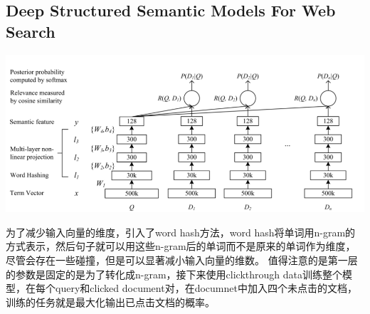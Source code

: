 \documentclass{article} %
\begin{document}
\begin{CJK*}{UTF8}{gkai}
\section{Deep Structured Semantic Models For Web Search}

\begin{center}
\includegraphics[width=6in]{deep-structured-semantic-models-for-web-search.png}
\end{center}
为了减少输入向量的维度，引入了word hash方法，word hash将单词用n-gram的方式表示，然后句子就可以用这些n-gram后的单词而不是原来的单词作为维度，尽管会存在一些碰撞，但是可以显著减小输入向量的维数。
值得注意的是第一层的参数是固定的是为了转化成n-gram，接下来使用clickthrough data训练整个模型，在每个query和clicked document对，在documnet中加入四个未点击的文档，训练的任务就是最大化输出已点击文档的概率。
\end{CJK*}
\end{document}
